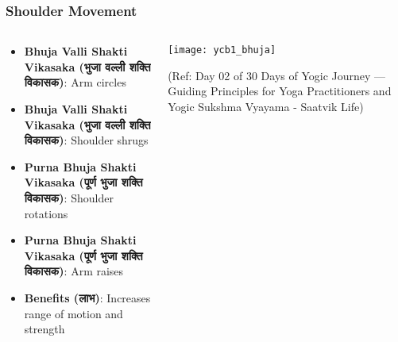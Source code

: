 \begin{frame}[fragile]\frametitle{Shoulder Movement}
\begin{columns}
    \begin{column}[T]{0.5\linewidth}
      \begin{itemize}
		\item \textbf{Bhuja Valli Shakti Vikasaka (भुजा वल्ली शक्ति विकासक)}: Arm circles
		\item \textbf{Bhuja Valli Shakti Vikasaka (भुजा वल्ली शक्ति विकासक)}: Shoulder shrugs
		\item \textbf{Purna Bhuja Shakti Vikasaka (पूर्ण भुजा शक्ति विकासक)}: Shoulder rotations
		\item \textbf{Purna Bhuja Shakti Vikasaka (पूर्ण भुजा शक्ति विकासक)}: Arm raises
		\item \textbf{Benefits (लाभ)}: Increases range of motion and strength
	  \end{itemize}
    \end{column}
    \begin{column}[T]{0.5\linewidth}
		\begin{center}
		        \texttt{[image: ycb1\_bhuja]}
				
				{\tiny (Ref: Day 02 of 30 Days of Yogic Journey — Guiding Principles for Yoga Practitioners and Yogic Sukshma Vyayama - Saatvik Life)}		
		\end{center}	
    \end{column}
\end{columns}
\end{frame}


